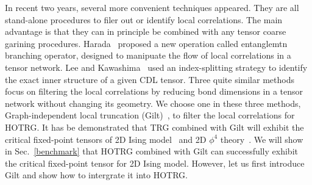 \documentclass[aps,prb,reprint,superscriptaddress]{revtex4-2}
\begin{document}
In recent two years, several more convenient techniques appeared. They are
all stand-alone procedures to filer out or identify local correlations.
The main advantage is that they can in principle be combined with any
tensor coarse garining procedures. Harada~\cite{harada2018} proposed a
new operation called entanglemtn branching operator, designed to
manipuate the flow of local correlations in a tensor network. Lee and
Kawashima~\cite{tensor-ring} used an index-splitting strategy to
identify the exact inner structure of a given CDL tensor. Three quite
similar methods~\cite{tns,gilts,fet} focus on filtering the local
correlations by reducing bond dimensions in a tensor network without
changing its geometry. We choose one in these three methods,
Graph-independent local truncation (Gilt)~\cite{gilts}, to filter the local
correlations for HOTRG. It has be demonstrated that TRG combined with
Gilt will exhibit the critical fixed-point tensors of 2D Ising
model~\cite{gilts} and 2D $\phi^4$ theory~\cite{Delcamp2020}. We will
show in Sec.~\ref{benchmark} that HOTRG combined with Gilt can
successfully exhibit the critical fixed-point tensor for 2D Ising model.
However, let us first introduce Gilt and show how to intergrate it into
HOTRG.
%
\end{document}
